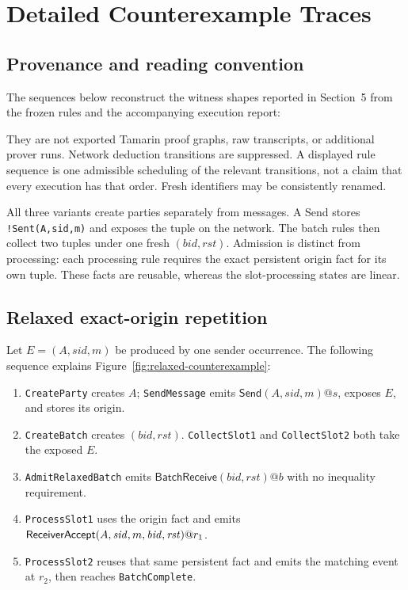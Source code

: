 \section{Detailed Counterexample Traces}
\label{app:trace-details}

\subsection{Provenance and reading convention}

The sequences below reconstruct the witness shapes reported in Section~5
from the frozen rules and the accompanying execution report:
\begin{center}
  \small{}
\end{center}
They are not exported Tamarin proof graphs,
raw transcripts, or additional prover runs. Network deduction transitions
are suppressed. A displayed rule sequence is one admissible scheduling of
the relevant transitions, not a claim that every execution has that order.
Fresh identifiers may be consistently renamed.

All three variants create parties separately from messages. A Send stores
\texttt{!Sent(A,sid,m)} and exposes the tuple on the network. The batch
rules then collect two tuples under one fresh $(\mathit{bid},\mathit{rst})$.
Admission is distinct from processing: each processing rule requires the
exact persistent origin fact for its own tuple. These facts are reusable,
whereas the slot-processing states are linear.

\subsection{Relaxed exact-origin repetition}

Let $E=(A,\mathit{sid},m)$ be produced by one sender occurrence. The following
sequence explains Figure~\ref{fig:relaxed-counterexample}:

\begin{enumerate}
  \item \texttt{CreateParty} creates $A$; \texttt{SendMessage} emits
    $\mathsf{Send}(A,\mathit{sid},m)@s$, exposes $E$, and stores its origin.
  \item \texttt{CreateBatch} creates $(\mathit{bid},\mathit{rst})$.
    \texttt{CollectSlot1} and \texttt{CollectSlot2} both take the exposed $E$.
  \item \texttt{AdmitRelaxedBatch} emits
    $\mathsf{BatchReceive}(\mathit{bid},\mathit{rst})@b$ with no inequality
    requirement.
  \item \texttt{ProcessSlot1} uses the origin fact and emits
    $\textsf{ReceiverAccept}(A,\mathit{sid},m,\mathit{bid},\mathit{rst})@r_1$.
  \item \texttt{ProcessSlot2} reuses that same persistent fact and emits the
    matching event at $r_2$, then reaches \texttt{BatchComplete}.
\end{enumerate}

